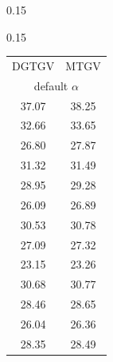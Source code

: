 \documentclass[twocolumn,envcountsame]{svjour3}
\begin{document}
\begin{table}[htb]
\begin{subtable}[t]{0.15\linewidth}
\label{table:MTGVvsDGTGVbest}                                                        
\end{subtable}%
\hspace*{0.5em}
\begin{subtable}[t]{0.15\linewidth}
\centering                                                                           
\setlength\tabcolsep{2pt}
\begin{tabular}{cc}                                                                  
\toprule                                                                              
DGTGV & MTGV \\  
\multicolumn{2}{c}{default $\alpha$}\\                                                                 
\midrule                                                                              
37.07 & 38.25 \\                                                   
32.66 & 33.65 \\                                                    
26.80 & 27.87 \\                                                   
\midrule                                                                              
31.32 & 31.49 \\                                                       
28.95 & 29.28 \\                                                       
26.09 & 26.89 \\                                                      
\midrule                                                                              
30.53 & 30.78 \\                                                
27.09 & 27.32 \\                                                  
23.15 & 23.26 \\                                                
\midrule                                                                              
30.68 & 30.77 \\                                               
28.46 & 28.65 \\                                               
26.04 & 26.36 \\                                              
\midrule                                                                              
28.35 & 28.49 \\                                                  

\end{tabular}
\end{subtable}
\end{table}
\end{document}
